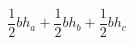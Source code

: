 \documentclass[preview]{standalone}
\begin{document}
\begin{align*}
\dfrac{1}{2} b h_a + \dfrac{1}{2} b h_b + \dfrac{1}{2} b h_c
\end{align*}
\end{document}
